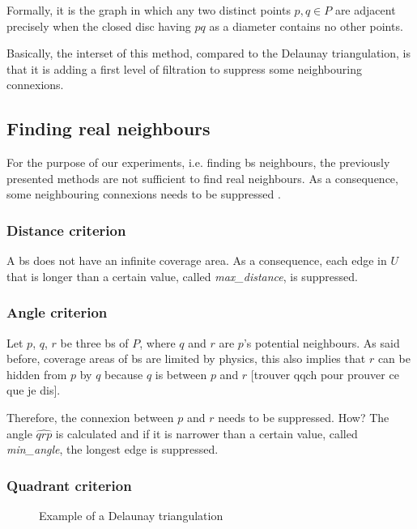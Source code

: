 \documentclass[lettersize,journal,english]{IEEEtran}
\begin{document}
Formally, it is the graph in which any two distinct points $p, q \in P$ are adjacent precisely when the closed disc having $pq$ as a diameter contains no other points.

Basically, the interset of this method, compared to the Delaunay triangulation, is that it is adding a first level of filtration to suppress some neighbouring connexions.

\subsection{Finding real neighbours}
For the purpose of our experiments, i.e. finding \acrshort{bs} neighbours, the previously presented methods are not sufficient to find real neighbours.
As a consequence, some neighbouring connexions needs to be suppressed \cite{patent_neighs}.
\subsubsection{Distance criterion\cite{patent_neighs}}
A \acrshort{bs} does not have an infinite coverage area.
As a consequence, each edge in $U$ that is longer than a certain value, called \emph{max\_distance}, is suppressed.

\subsubsection{Angle criterion}
Let $p$, $q$, $r$ be three \acrshort{bs} of $P$, where $q$ and $r$ are $p$'s potential neighbours. As said before, coverage areas of \acrshort{bs} are limited by physics, this also implies that $r$ can be \og hidden\fg{} from $p$ by $q$ because $q$ is between $p$ and $r$ [trouver qqch pour prouver ce que je dis].

Therefore, the connexion between $p$ and $r$ needs to be suppressed. How? The angle $\widehat{qrp}$ is calculated and if it is narrower than a certain value, called \emph{min\_angle}, the longest edge is suppressed.

\subsubsection{Quadrant criterion}
\begin{figure}[!b]
    \centering
    \caption{Example of a Delaunay triangulation}
    \label{fig:crit_qua}
\end{figure}
\end{document}

